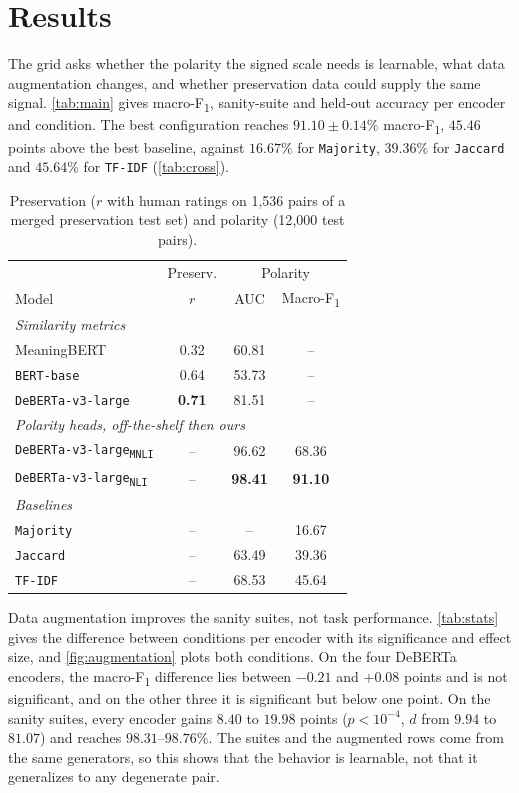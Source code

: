 \documentclass[11pt]{article}
\begin{document}


\section{Results}
\label{sec:results}

The grid asks whether the polarity the signed scale needs is learnable, what data augmentation changes, and whether preservation data could supply the same signal.
\autoref{tab:main} gives macro-F\textsubscript{1}, sanity-suite and held-out accuracy per encoder and condition.
The best configuration reaches $91.10 \pm 0.14\%$ macro-F\textsubscript{1}, $45.46$ points above the best baseline, against $16.67\%$ for \texttt{Majority}, $39.36\%$ for \texttt{Jaccard} and $45.64\%$ for \texttt{TF-IDF} (\autoref{tab:cross}).

\begin{table}[t]
\centering\small
\setlength{\tabcolsep}{4pt}
\begin{tabular}{l ccc}
\toprule
 & Preserv. & \multicolumn{2}{c}{Polarity} \\
Model & $r$ & AUC & Macro-F\textsubscript{1} \\
\midrule
\multicolumn{4}{l}{\emph{Similarity metrics}} \\
MeaningBERT & 0.32 & 60.81 & -- \\
\texttt{BERT-base} & 0.64 & 53.73 & -- \\
\texttt{DeBERTa-v3-large} & \textbf{0.71} & 81.51 & -- \\
\multicolumn{4}{l}{\emph{Polarity heads, off-the-shelf then ours}} \\
\texttt{DeBERTa-v3-large\textsubscript{MNLI}} & -- & 96.62 & 68.36 \\
\texttt{DeBERTa-v3-large\textsubscript{NLI}} & -- & \textbf{98.41} & \textbf{91.10} \\
\multicolumn{4}{l}{\emph{Baselines}} \\
\texttt{Majority} & -- & -- & 16.67 \\
\texttt{Jaccard} & -- & 63.49 & 39.36 \\
\texttt{TF-IDF} & -- & 68.53 & 45.64 \\
\bottomrule
\end{tabular}
\caption{Preservation ($r$ with human ratings on 1{,}536 pairs of a merged preservation test set) and polarity (12{,}000 test pairs).}
\label{tab:cross}
\end{table}

Data augmentation improves the sanity suites, not task performance.
\autoref{tab:stats} gives the difference between conditions per encoder with its significance and effect size, and \autoref{fig:augmentation} plots both conditions.
On the four DeBERTa encoders, the macro-F\textsubscript{1} difference lies between $-0.21$ and $+0.08$ points and is not significant, and on the other three it is significant but below one point.
On the sanity suites, every encoder gains $8.40$ to $19.98$ points ($p < 10^{-4}$, $d$ from $9.94$ to $81.07$) and reaches $98.31$--$98.76\%$.
The suites and the augmented rows come from the same generators, so this shows that the behavior is learnable, not that it generalizes to any degenerate pair.
\end{document}
